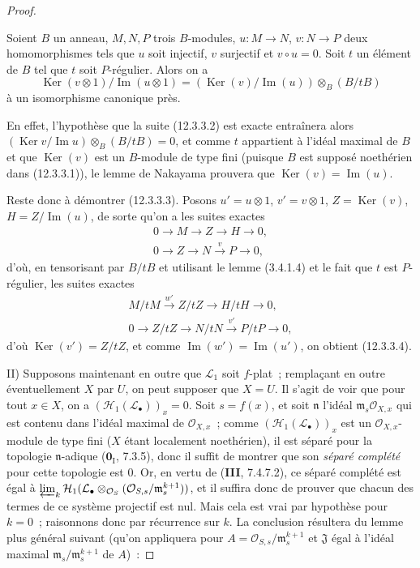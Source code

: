 \begin{proof}
\begin{lemma}[12.3.3.3]
\label{IV.12.3.3.3-fr}
Soient $B$ un anneau, $M,N,P$ trois $B$-modules,
$u:M\to N$, $v:N\to P$ deux homomorphismes tels que $u$ soit injectif, $v$
surjectif et $v\circ u=0$. Soit $t$ un élément de $B$ tel que $t$ soit
$P$-régulier. Alors on a
\begin{equation}
  \tag{12.3.3.4}
  \label{IV.12.3.3.4-fr}
  \operatorname{Ker}(v\otimes1)/\operatorname{Im}(u\otimes1)
  =(\operatorname{Ker}(v)/\operatorname{Im}(u))\otimes_B(B/tB)
\end{equation}
à un isomorphisme canonique près.
\end{lemma}

En effet, l'hypothèse que la suite (12.3.3.2) est exacte entraînera alors
$(\operatorname{Ker}v/\operatorname{Im}u)\otimes_B(B/tB)=0$, et comme $t$
appartient à l'idéal maximal de $B$ et que $\operatorname{Ker}(v)$ est un
$B$-module de type fini (puisque $B$ est supposé noethérien dans (12.3.3.1)),
le lemme de Nakayama prouvera que $\operatorname{Ker}(v)=\operatorname{Im}(u)$.

Reste donc à démontrer (12.3.3.3). Posons $u'=u\otimes1$, $v'=v\otimes1$,
$Z=\operatorname{Ker}(v)$, $H=Z/\operatorname{Im}(u)$, de sorte qu'on a les
suites exactes
\begin{gather*}
  0\to M\to Z\to H\to0,\\
  0\to Z\to N\xrightarrow{v}P\to0,
\end{gather*}
d'où, en tensorisant par $B/tB$ et utilisant le lemme (3.4.1.4) et le fait que
$t$ est $P$-régulier, les suites exactes
\begin{gather*}
  M/tM\xrightarrow{w'}Z/tZ\to H/tH\to0,\\
  0\to Z/tZ\to N/tN\xrightarrow{v'}P/tP\to0,
\end{gather*}
d'où $\operatorname{Ker}(v')=Z/tZ$, et comme
$\operatorname{Im}(w')=\operatorname{Im}(u')$, on obtient (12.3.3.4).

\medskip
II) Supposons maintenant en outre que $\mathcal L_1$ soit $f$-plat~;
remplaçant en outre éventuellement $X$ par $U$, on peut supposer que $X=U$.
Il s'agit de voir que pour tout $x\in X$, on a
$(\mathcal H_1(\mathcal L_\bullet))_x=0$. Soit $s=f(x)$, et soit
$\mathfrak n$ l'idéal $\mathfrak m_s\mathcal O_{X,x}$ qui est contenu dans
l'idéal maximal de $\mathcal O_{X,x}$~; comme
$(\mathcal H_1(\mathcal L_\bullet))_x$ est un $\mathcal O_{X,x}$-module de type
fini ($X$ étant localement noethérien), il est séparé pour la topologie
$\mathfrak n$-adique ($\mathbf 0_{\mathrm I}$, 7.3.5), donc il suffit de
montrer que son \emph{séparé complété} pour cette topologie est 0. Or, en vertu
de (\textbf{III}, 7.4.7.2), ce séparé complété est égal à
$\varprojlim_k\mathcal H_1(\mathcal L_\bullet\otimes_{\mathcal O_S}
(\mathcal O_{S,s}/\mathfrak m_s^{k+1}))$, et il suffira donc de prouver que
chacun des termes de ce système projectif est nul. Mais cela est vrai par
hypothèse pour $k=0$~; raisonnons donc par récurrence sur $k$. La conclusion
résultera du lemme plus général suivant (qu'on appliquera pour
$A=\mathcal O_{S,s}/\mathfrak m_s^{k+1}$ et $\mathfrak J$ égal à l'idéal
maximal $\mathfrak m_s/\mathfrak m_s^{k+1}$ de $A$)~:


\end{proof}
